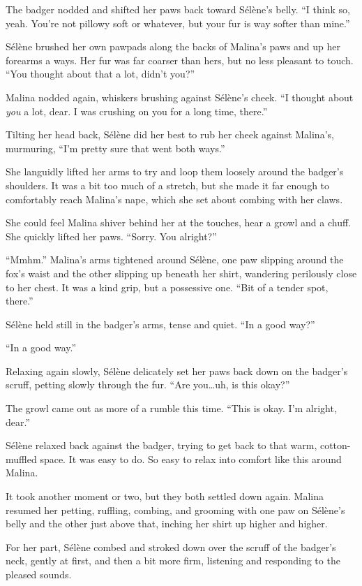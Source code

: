 The badger nodded and shifted her paws back toward Sélène's belly. ``I think so, yeah. You're not pillowy soft or whatever, but your fur is way softer than mine.''

Sélène brushed her own pawpads along the backs of Malina's paws and up her forearms a ways. Her fur was far coarser than hers, but no less pleasant to touch. ``You thought about that a lot, didn't you?''

Malina nodded again, whiskers brushing against Sélène's cheek. ``I thought about \emph{you} a lot, dear. I was crushing on you for a long time, there.''

Tilting her head back, Sélène did her best to rub her cheek against Malina's, murmuring, ``I'm pretty sure that went both ways.''

She languidly lifted her arms to try and loop them loosely around the badger's shoulders. It was a bit too much of a stretch, but she made it far enough to comfortably reach Malina's nape, which she set about combing with her claws.

She could feel Malina shiver behind her at the touches, hear a growl and a chuff. She quickly lifted her paws. ``Sorry. You alright?''

``Mmhm.'' Malina's arms tightened around Sélène, one paw slipping around the fox's waist and the other slipping up beneath her shirt, wandering perilously close to her chest. It was a kind grip, but a possessive one. ``Bit of a tender spot, there.''

Sélène held still in the badger's arms, tense and quiet. ``In a good way?''

``In a good way.''

Relaxing again slowly, Sélène delicately set her paws back down on the badger's scruff, petting slowly through the fur. ``Are you\ldots{}uh, is this okay?''

The growl came out as more of a rumble this time. ``This is okay. I'm alright, dear.''

Sélène relaxed back against the badger, trying to get back to that warm, cotton-muffled space. It was easy to do. So easy to relax into comfort like this around Malina.

It took another moment or two, but they both settled down again. Malina resumed her petting, ruffling, combing, and grooming with one paw on Sélène's belly and the other just above that, inching her shirt up higher and higher.

For her part, Sélène combed and stroked down over the scruff of the badger's neck, gently at first, and then a bit more firm, listening and responding to the pleased sounds.

